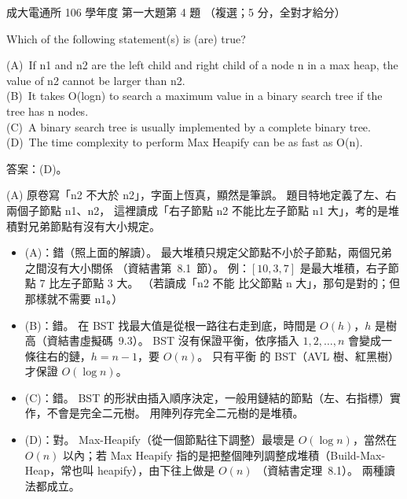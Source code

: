\begin{pastexam}[label={px:ncku-106-cce-ds-04}]{成大電通所 106 學年度 第一大題第 4 題}
（複選；5 分，全對才給分）

Which of the following statement(s) is (are) true?

(A)~If n1 and n2 are the left child and right child of a node n in a max heap, the value of n2
cannot be larger than n2.\\
(B)~It takes O(logn) to search a maximum value in a binary search tree if the tree has n nodes.\\
(C)~A binary search tree is usually implemented by a complete binary tree.\\
(D)~The time complexity to perform Max Heapify can be as fast as O(n).
\end{pastexam}

\begin{pastsoln}
答案：(D)。

(A) 原卷寫「n2 不大於 n2」，字面上恆真，顯然是筆誤。 題目特地定義了左、右兩個子節點 n1、n2，
這裡讀成「右子節點 n2 不能比左子節點 n1 大」，考的是堆積對兄弟節點有沒有大小規定。

\begin{itemize}
\item (A)：錯（照上面的解讀）。 最大堆積只規定父節點不小於子節點，兩個兄弟之間沒有大小關係
（資結書第~8.1~節）。 例：$[10, 3, 7]$ 是最大堆積，右子節點 $7$ 比左子節點 $3$ 大。 （若讀成「n2 不能
比父節點 n 大」，那句是對的；但那樣就不需要 n1。）
\item (B)：錯。 在 BST 找最大值是從根一路往右走到底，時間是 $O(h)$，$h$ 是樹高（資結書虛擬碼~9.3）。
BST 沒有保證平衡，依序插入 $1, 2, \ldots, n$ 會變成一條往右的鏈，$h = n - 1$，要 $O(n)$。 只有平衡
的 BST（AVL 樹、紅黑樹）才保證 $O(\log n)$。
\item (C)：錯。 BST 的形狀由插入順序決定，一般用鏈結的節點（左、右指標）實作，不會是完全二元樹。
用陣列存完全二元樹的是堆積。
\item (D)：對。 Max-Heapify（從一個節點往下調整）最壞是 $O(\log n)$，當然在 $O(n)$ 以內；若 Max
Heapify 指的是把整個陣列調整成堆積（Build-Max-Heap，常也叫 heapify），由下往上做是 $O(n)$
（資結書定理~8.1）。 兩種讀法都成立。
\end{itemize}
\end{pastsoln}
